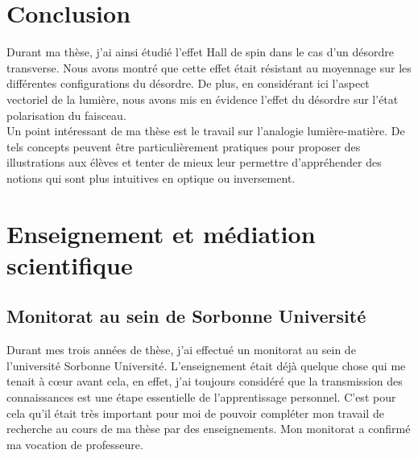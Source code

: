 \documentclass[a4paper,11pt]{article} %
\begin{document}
	
	\section{Conclusion}
	
	Durant ma thèse, j'ai ainsi étudié l'effet Hall de spin dans le cas d'un désordre transverse. Nous avons montré que cette effet était résistant au moyennage sur les différentes configurations du désordre. De plus, en considérant ici l'aspect vectoriel de la lumière, nous avons mis en évidence l'effet du désordre sur l'état polarisation du faisceau.\\
	
	Un point intéressant de ma thèse est le travail sur l'analogie lumière-matière. De tels concepts peuvent être particulièrement pratiques pour proposer des illustrations aux élèves et tenter de mieux leur permettre d'appréhender des notions qui sont plus intuitives en optique ou inversement.
	
	
	\section{Enseignement et médiation scientifique}
	\subsection{Monitorat au sein de Sorbonne Université}
	Durant mes trois années de thèse, j'ai effectué un monitorat au sein de l'université Sorbonne Université. L'enseignement était déjà quelque chose qui me tenait à cœur avant cela, en effet, j'ai toujours considéré que la transmission des connaissances est une étape essentielle de l'apprentissage personnel. C'est pour cela qu'il était très important pour moi de pouvoir compléter mon travail de recherche au cours de ma thèse par des enseignements. Mon monitorat a confirmé ma vocation de professeure.\\ 
	
\end{document}
